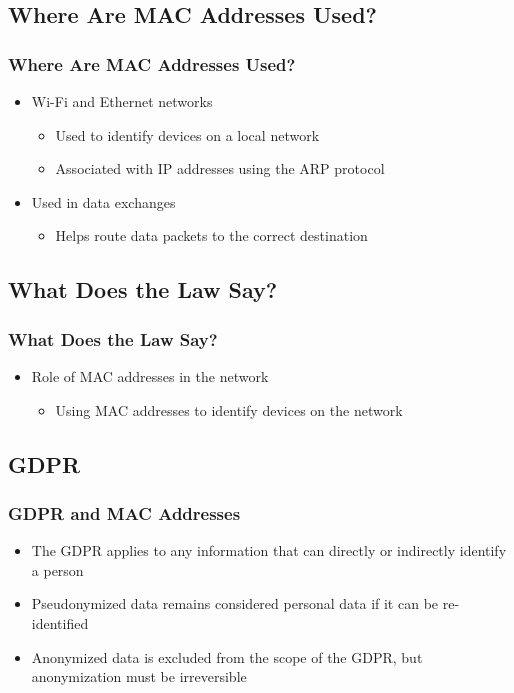 \documentclass[
english,
svgnames,
notes=hide,
12pt]{beamer}
\begin{document}
\begin{frame}
  \section{Where Are MAC Addresses Used?}
  \frametitle{Where Are MAC Addresses Used?}
  \begin{itemize}
    \item Wi-Fi and Ethernet networks \pause
      \begin{itemize}
        \item Used to identify devices on a local network \pause
        \item Associated with IP addresses using the ARP protocol \pause
      \end{itemize}
    \item Used in data exchanges \pause
      \begin{itemize}
        \item Helps route data packets to the correct destination 
      \end{itemize}
  \end{itemize}
\end{frame}

\begin{frame}
  \section{What Does the Law Say?}
  \frametitle{What Does the Law Say?}
  \begin{itemize}
    \item Role of MAC addresses in the network \pause
      \begin{itemize}
        \item Using MAC addresses to identify devices on the network 
      \end{itemize}
  \end{itemize}
\end{frame}

\begin{frame}
  \section{GDPR}
  \frametitle{GDPR and MAC Addresses}
  \begin{itemize}
    \item The GDPR applies to any information that can directly or indirectly identify a person \pause
    \item Pseudonymized data remains considered personal data if it can be re-identified \pause
    \item Anonymized data is excluded from the scope of the GDPR, but anonymization must be irreversible 
  \end{itemize}
\end{frame}
\end{document}
